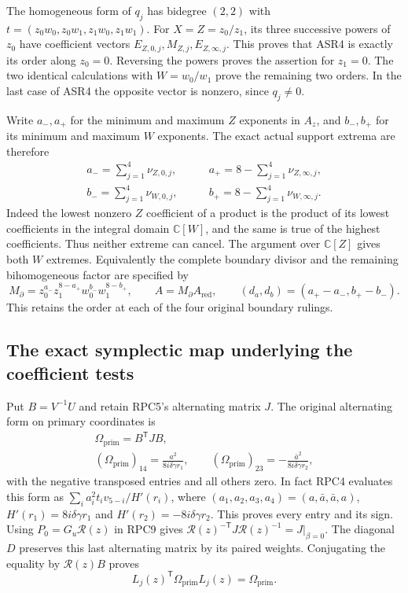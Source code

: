 \documentclass[11pt,a4paper]{article}
\begin{document}
The homogeneous form of $q_j$ has bidegree $(2,2)$ with
$t=(z_0w_0,z_0w_1,z_1w_0,z_1w_1)$. For $X=Z=z_0/z_1$,
its three successive powers of $z_0$ have coefficient vectors
$E_{Z,0,j},M_{Z,j},E_{Z,\infty,j}$. This proves that ASR4 is
exactly its order along $z_0=0$. Reversing the powers proves
the assertion for $z_1=0$. The two identical calculations with
$W=w_0/w_1$ prove the remaining two orders. In the last case
of ASR4 the opposite vector is nonzero, since $q_j\ne0$.

Write $a_-,a_+$ for the minimum and maximum $Z$ exponents in
$A_z$, and $b_-,b_+$ for its minimum and maximum $W$ exponents.
The exact actual support extrema are therefore
\[
\boxed{\begin{aligned}
 a_- =\sum_{j=1}^4\nu_{Z,0,j},\qquad
 &a_+ =8-\sum_{j=1}^4\nu_{Z,\infty,j},\\
 b_- =\sum_{j=1}^4\nu_{W,0,j},\qquad
 &b_+ =8-\sum_{j=1}^4\nu_{W,\infty,j}.
\end{aligned}}
 \tag{ASR5}
\]
Indeed the lowest nonzero $Z$ coefficient of a product is the
product of its lowest coefficients in the integral domain
$\mathbb C[W]$, and the same is true of the highest coefficients.
Thus neither extreme can cancel. The argument over $\mathbb C[Z]$
gives both $W$ extremes. Equivalently the complete boundary divisor
and the remaining bihomogeneous factor are specified by
\[
 M_{\partial}=z_0^{a_-}z_1^{8-a_+}w_0^{b_-}w_1^{8-b_+},
 \qquad A=M_{\partial}A_{\mathrm{red}},\qquad
 (d_a,d_b)=(a_+-a_-,b_+-b_-).
 \tag{ASR6}
\]
This retains the order at each of the four original boundary rulings.

\subsection{The exact symplectic map underlying the coefficient tests}
Put $B=V^{-1}U$ and retain RPC5's alternating matrix $J$.
The original alternating form on primary coordinates is
\[
\begin{gathered}
 \Omega_{\mathrm{prim}}=B^{\mathsf T}JB,\\
 (\Omega_{\mathrm{prim}})_{14}=\frac{a^2}{8i\delta\gamma r_1},
 \qquad
 (\Omega_{\mathrm{prim}})_{23}=-\frac{\bar a^2}{8i\delta\gamma r_2},
\end{gathered}
 \tag{ASR7}
\]
with the negative transposed entries and all others zero. In fact
RPC4 evaluates this form as
$\sum_i a_i^2t_iv_{5-i}/H'(r_i)$, where
$(a_1,a_2,a_3,a_4)=(a,\bar a,\bar a,a)$,
$H'(r_1)=8i\delta\gamma r_1$ and
$H'(r_2)=-8i\delta\gamma r_2$. This proves every entry and its sign.
Using $P_0=G_u\mathcal R(z)$ in RPC9 gives
$\mathcal R(z)^{-\mathsf T}J\mathcal R(z)^{-1}=J|_{\beta=0}$.
The diagonal $D$ preserves this last alternating matrix by its paired
weights. Conjugating the equality by $\mathcal R(z)B$ proves
\[
 L_j(z)^{\mathsf T}\Omega_{\mathrm{prim}}L_j(z)
       =\Omega_{\mathrm{prim}}.
 \tag{ASR8}
\]
\end{document}
